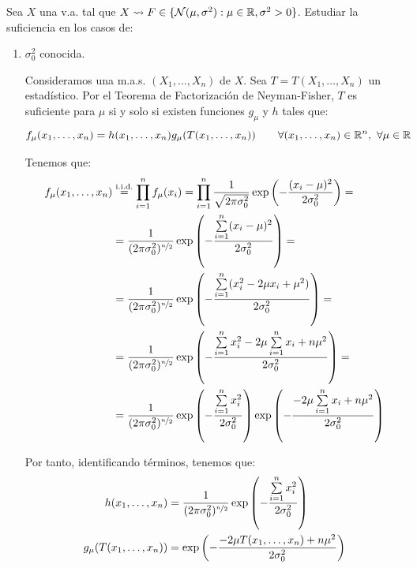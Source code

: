 \begin{ejemplo}
    Sea $X$ una v.a. tal que $X\rightsquigarrow F\in \{\mathcal{N}(\mu, \sigma^2) : \mu\in\mathbb{R}, \sigma^2>0\}$. Estudiar la suficiencia en los casos de:
    \begin{enumerate}
        \item $\sigma_0^2$ conocida.
        
        Consideramos una m.a.s. $(X_1, \ldots, X_n)$ de $X$. Sea $T=T(X_1, \ldots, X_n)$ un estadístico. Por el Teorema de Factorización de Neyman-Fisher, $T$ es suficiente para $\mu$ si y solo si existen funciones $g_\mu$ y $h$ tales que:
        \begin{equation*}
            f_\mu(x_1, \ldots, x_n) = h(x_1, \ldots, x_n) g_\mu(T(x_1, \ldots, x_n)) \qquad \forall (x_1, \ldots, x_n)\in\mathbb{R}^n,\ \forall \mu\in\mathbb{R}
        \end{equation*}

        Tenemos que:
        \begin{align*}
            f_\mu(x_1, \ldots, x_n) 
            &\stackrel{\text{i.i.d.}}{=}
            \prod_{i=1}^n f_\mu(x_i)
            = \prod_{i=1}^n \dfrac{1}{\sqrt{2\pi\sigma_0^2}} \exp\left(-\dfrac{(x_i-\mu)^2}{2\sigma_0^2}\right)
            =\\&= \dfrac{1}{(2\pi\sigma_0^2)^{\nicefrac{n}{2}}} \exp\left(-\dfrac{\sum\limits_{i=1}^n (x_i-\mu)^2}{2\sigma_0^2}\right)
            =\\&= \dfrac{1}{(2\pi\sigma_0^2)^{\nicefrac{n}{2}}} \exp\left(-\dfrac{\sum\limits_{i=1}^n (x_i^2 - 2\mu x_i + \mu^2)}{2\sigma_0^2}\right)
            =\\&= \dfrac{1}{(2\pi\sigma_0^2)^{\nicefrac{n}{2}}} \exp\left(-\dfrac{\sum\limits_{i=1}^n x_i^2 - 2\mu \sum\limits_{i=1}^n x_i + n\mu^2}{2\sigma_0^2}\right)
            =\\&= \dfrac{1}{(2\pi\sigma_0^2)^{\nicefrac{n}{2}}} \exp\left(-\dfrac{\sum\limits_{i=1}^n x_i^2}{2\sigma_0^2}\right) \exp\left(-\dfrac{- 2\mu \sum\limits_{i=1}^n x_i + n\mu^2}{2\sigma_0^2}\right)
        \end{align*}

        Por tanto, identificando términos, tenemos que:
        \begin{align*}
            h(x_1, \ldots, x_n) &= \dfrac{1}{(2\pi\sigma_0^2)^{\nicefrac{n}{2}}} \exp\left(-\dfrac{\sum\limits_{i=1}^n x_i^2}{2\sigma_0^2}\right) \\
            g_\mu(T(x_1, \ldots, x_n)) &= \exp\left(-\dfrac{- 2\mu T(x_1, \ldots, x_n) + n\mu^2}{2\sigma_0^2}\right)
        \end{align*}


\end{enumerate}
\end{ejemplo}
